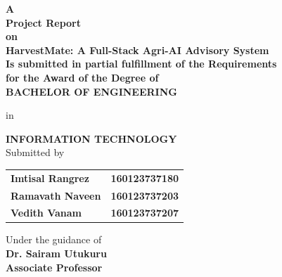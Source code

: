 \documentclass[12pt,a4paper]{report}
\begin{document}

\setcounter{page}{1}

\begin{titlepage}
\begin{center}
\vspace{2cm} 


\normalsize \textbf{A \\[0.075in] Project Report\\ [0.075in]on}  \\
[0.075in]
\vspace{1.5em}%
\LARGE{\textbf{HarvestMate: A Full-Stack Agri-AI Advisory System}} \\%
\vspace{1.5em}%
\normalsize\textbf{Is submitted in partial fulfillment of the Requirements\\ [0.075in]
for the Award of the Degree of} \\ [0.075in]
\vspace{1.5em}
\uppercase{\bf{\textsc{BACHELOR OF ENGINEERING}}} \\
\vspace{0.5em}

in \\
\vspace{0.5em}

\textbf{INFORMATION TECHNOLOGY} \\
\vspace{0.5em}
 Submitted by\\

\vspace{0.5em}
\begin{center}
	
	\begin{table}[h!]
		\centering
		\begin{tabular}{l l}
			\textbf{Imtisal Rangrez} & \textbf{160123737180 }\\ [0.025in]
			\textbf{Ramavath Naveen} & \textbf{160123737203} \\ [0.025in]
			\textbf{Vedith Vanam} & \textbf{160123737207} \\ [0.025in]
		\end{tabular} 
	\end{table}
\end{center}
Under the guidance of\\ [0.075in]
\textbf{Dr. Sairam Utukuru}\\ [0.075in]
\textbf{Associate Professor}\\ [0.075in]



\end{center}
\end{titlepage}
\end{document}
